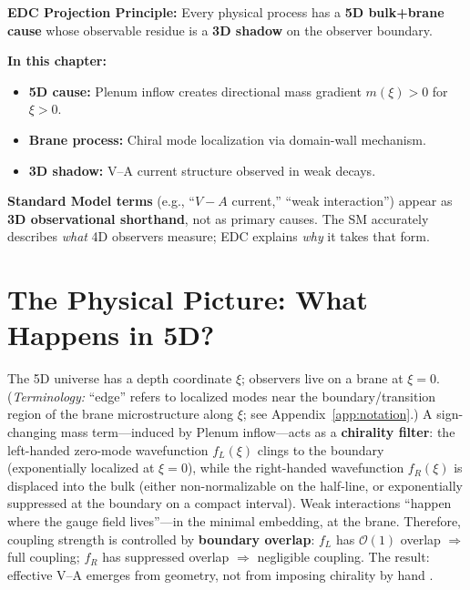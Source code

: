\begin{tcolorbox}[colback=blue!3!white, colframe=blue!50!black,
    title=\textbf{Framework 2.0 Language Compliance}]
\small
\textbf{EDC Projection Principle:} Every physical process has a \textbf{5D bulk+brane cause}
whose observable residue is a \textbf{3D shadow} on the observer boundary.

\textbf{In this chapter:}
\begin{itemize}[nosep]
    \item \textbf{5D cause:} Plenum inflow creates directional mass gradient $m(\xi) > 0$ for $\xi > 0$.
    \item \textbf{Brane process:} Chiral mode localization via domain-wall mechanism.
    \item \textbf{3D shadow:} V--A current structure observed in weak decays.
\end{itemize}

\textbf{Standard Model terms} (e.g., ``$V{-}A$ current,'' ``weak interaction'') appear as
\textbf{3D observational shorthand}, not as primary causes. The SM accurately describes
\emph{what} 4D observers measure; EDC explains \emph{why} it takes that form.
\end{tcolorbox}

\section{The Physical Picture: What Happens in 5D?}
\label{sec:ch9_physical_picture}

\begin{tcolorbox}[colback=green!5!white, colframe=green!50!black,
    title=\textbf{The V--A Mechanism in One Paragraph}]
The 5D universe has a depth coordinate $\xi$; observers live on a brane at $\xi = 0$.
(\emph{Terminology:} ``edge'' refers to localized modes near the boundary/transition
region of the brane microstructure along $\xi$; see Appendix~\ref{app:notation}.)
A sign-changing mass term---induced by Plenum inflow---acts as a \textbf{chirality
filter}: the left-handed zero-mode wavefunction $f_L(\xi)$ clings to the boundary
(exponentially localized at $\xi = 0$), while the right-handed wavefunction $f_R(\xi)$
is displaced into the bulk (either non-normalizable on the half-line, or
exponentially suppressed at the boundary on a compact interval). Weak interactions
``happen where the gauge field lives''---in the minimal embedding, at the brane.
Therefore, coupling strength is controlled by \textbf{boundary overlap}: $f_L$ has
$\mathcal{O}(1)$ overlap $\Rightarrow$ full coupling; $f_R$ has suppressed overlap
$\Rightarrow$ negligible coupling. The result: effective V--A emerges from geometry,
not from imposing chirality by hand \tagDc{}.
\end{tcolorbox}

